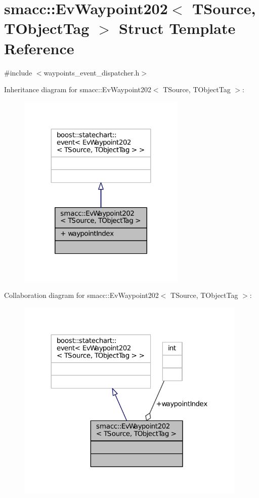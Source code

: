 \hypertarget{structsmacc_1_1EvWaypoint202}{}\section{smacc\+:\+:Ev\+Waypoint202$<$ T\+Source, T\+Object\+Tag $>$ Struct Template Reference}
\label{structsmacc_1_1EvWaypoint202}


{\ttfamily \#include $<$waypoints\+\_\+event\+\_\+dispatcher.\+h$>$}



Inheritance diagram for smacc\+:\+:Ev\+Waypoint202$<$ T\+Source, T\+Object\+Tag $>$\+:
\nopagebreak
\begin{figure}[H]
\begin{center}
\leavevmode
\includegraphics[width=227pt]{structsmacc_1_1EvWaypoint202__inherit__graph}
\end{center}
\end{figure}


Collaboration diagram for smacc\+:\+:Ev\+Waypoint202$<$ T\+Source, T\+Object\+Tag $>$\+:
\nopagebreak
\begin{figure}[H]
\begin{center}
\leavevmode
\includegraphics[width=312pt]{structsmacc_1_1EvWaypoint202__coll__graph}
\end{center}
\end{figure}
